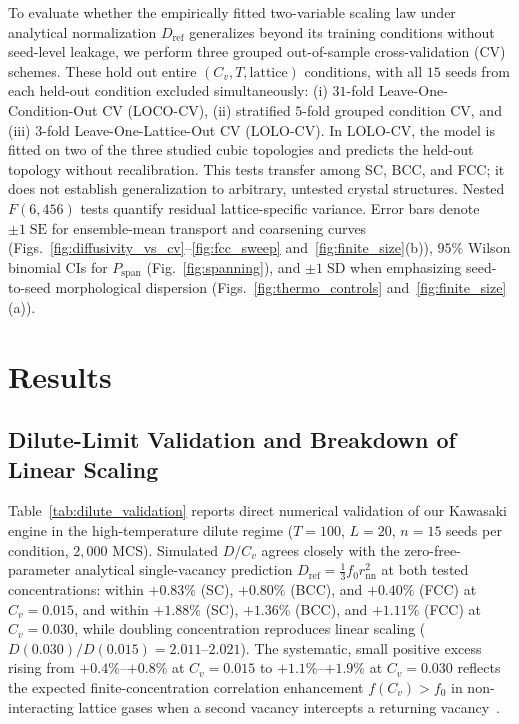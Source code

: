 \documentclass[aps,pre,reprint,superscriptaddress,amsmath,amssymb,floatfix]{revtex4-2}
\begin{document}
To evaluate whether the empirically fitted two-variable scaling law under analytical normalization $D_{\mathrm{ref}}$ generalizes beyond its training conditions without seed-level leakage, we perform three grouped out-of-sample cross-validation (CV) schemes. These hold out entire $(C_v,T,\text{lattice})$ conditions, with all $15$ seeds from each held-out condition excluded simultaneously: (i) $31$-fold Leave-One-Condition-Out CV (LOCO-CV), (ii) stratified $5$-fold grouped condition CV, and (iii) $3$-fold Leave-One-Lattice-Out CV (LOLO-CV). In LOLO-CV, the model is fitted on two of the three studied cubic topologies and predicts the held-out topology without recalibration. This tests transfer among SC, BCC, and FCC; it does not establish generalization to arbitrary, untested crystal structures. Nested $F(6,456)$ tests quantify residual lattice-specific variance. Error bars denote $\pm 1\;\mathrm{SE}$ for ensemble-mean transport and coarsening curves (Figs.~\ref{fig:diffusivity_vs_cv}--\ref{fig:fcc_sweep} and~\ref{fig:finite_size}(b)), $95\%$ Wilson binomial CIs for $P_{\mathrm{span}}$ (Fig.~\ref{fig:spanning}), and $\pm 1\;\mathrm{SD}$ when emphasizing seed-to-seed morphological dispersion (Figs.~\ref{fig:thermo_controls} and~\ref{fig:finite_size}(a)).

\section{Results}
\label{sec:results}

\subsection{Dilute-Limit Validation and Breakdown of Linear Scaling}
\label{sec:dilute}

Table~\ref{tab:dilute_validation} reports direct numerical validation of our Kawasaki engine in the high-temperature dilute regime ($T = 100$, $L = 20$, $n = 15$ seeds per condition, $2{,}000$ MCS). Simulated $D/C_v$ agrees closely with the zero-free-parameter analytical single-vacancy prediction $D_{\mathrm{ref}} = \frac{1}{3}f_0 r_{\mathrm{nn}}^2$ at both tested concentrations: within $+0.83\%$ (SC), $+0.80\%$ (BCC), and $+0.40\%$ (FCC) at $C_v = 0.015$, and within $+1.88\%$ (SC), $+1.36\%$ (BCC), and $+1.11\%$ (FCC) at $C_v = 0.030$, while doubling concentration reproduces linear scaling ($D(0.030)/D(0.015) = 2.011$--$2.021$). The systematic, small positive excess rising from $+0.4\%$--$+0.8\%$ at $C_v = 0.015$ to $+1.1\%$--$+1.9\%$ at $C_v = 0.030$ reflects the expected finite-concentration correlation enhancement $f(C_v) > f_0$ in non-interacting lattice gases when a second vacancy intercepts a returning vacancy~\cite{Murch1977,Kehr1984}.
\end{document}
